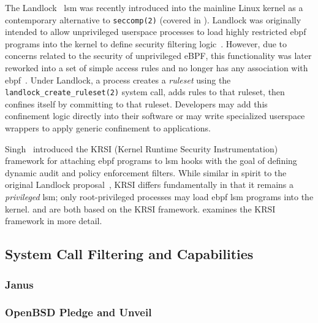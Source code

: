 The Landlock~\cite{salaun_landlockio, salaun_landlock_patch} \gls{lsm} was recently
introduced into the mainline Linux kernel as a contemporary alternative to
\texttt{seccomp(2)} (covered in ). Landlock was originally intended to
allow unprivileged userspace processes to load highly restricted \gls{ebpf} programs into
the kernel to define security filtering logic~\cite{salaun_landlock_patch}. However, due
to concerns related to the security of unprivileged eBPF, this functionality was later
reworked into a set of simple access rules and no longer has any association with
\gls{ebpf}~\cite{salaun_landlockio}. Under Landlock, a process creates a \textit{ruleset}
using the \texttt{landlock\_create\_ruleset(2)} system call, adds rules to that ruleset,
then confines itself by committing to that ruleset. Developers may add this confinement
logic directly into their software or may write specialized userspace wrappers to apply
generic confinement to applications.

Singh~\cite{singh2019_krsi} introduced the KRSI (Kernel Runtime Security Instrumentation)
framework for attaching \gls{ebpf} programs to \gls{lsm} hooks with the goal of defining
dynamic audit and policy enforcement filters. While similar in spirit to the original
Landlock proposal~\cite{salaun_landlock_patch}, KRSI differs fundamentally in that it
remains a \textit{privileged} \gls{lsm}; only root-privileged processes may load \gls{ebpf}
\gls{lsm} programs into the kernel. \bpfcontain{} and \bpfbox{} are both based on the KRSI
framework.  examines the KRSI framework in more detail.




\subsection{System Call Filtering and Capabilities}%
\label{ss:syscall-filtering}

\subsubsection*{Janus}
\label{sss:janus}

\subsubsection*{OpenBSD Pledge and Unveil}
\label{sss:pledge}

